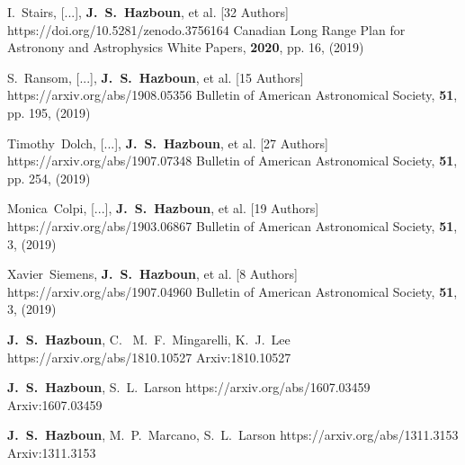          {I.~{Stairs}, [...], \textbf{J.~S.~{Hazboun}}, et al. [32 Authors]}
         {https://doi.org/10.5281/zenodo.3756164}
         {{Canadian Long Range Plan for Astronony and Astrophysics White Papers}, \textbf{2020}, pp. 16, (2019)}

         {S.~{Ransom}, [...], \textbf{J.~S.~{Hazboun}}, et al. [15 Authors]}
         {https://arxiv.org/abs/1908.05356}
         {{Bulletin of American Astronomical Society}, \textbf{51}, pp. 195, (2019)}

         {Timothy~{Dolch}, [...], \textbf{J.~S.~{Hazboun}}, et al. [27 Authors]}
         {https://arxiv.org/abs/1907.07348}
         {{Bulletin of American Astronomical Society}, \textbf{51}, pp. 254, (2019)}

         {Monica~{Colpi}, [...], \textbf{J.~S.~{Hazboun}}, et al. [19 Authors]}
         {https://arxiv.org/abs/1903.06867}
         {{Bulletin of American Astronomical Society}, \textbf{51}, 3, (2019)}

         {Xavier~{Siemens}, \textbf{J.~S.~{Hazboun}}, et al. [8 Authors]}
         {https://arxiv.org/abs/1907.04960}
         {{Bulletin of American Astronomical Society}, \textbf{51}, 3, (2019)}

         {\textbf{J.~S.~Hazboun}, C.~ M.~F.~{Mingarelli}, K.~J.~{Lee}}
         {https://arxiv.org/abs/1810.10527}
         {{Arxiv:}1810.10527}

         {\textbf{J.~S.~Hazboun}, S.~L.~{Larson}}
         {https://arxiv.org/abs/1607.03459}
         {{Arxiv:}1607.03459}

         {\textbf{J.~S.~Hazboun}, M.~P.~{Marcano}, S.~L.~{Larson}}
         {https://arxiv.org/abs/1311.3153}
         {{Arxiv:}1311.3153}

